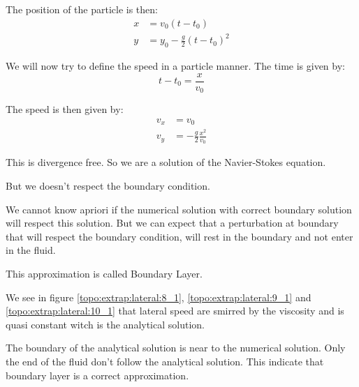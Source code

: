 The position of the particle is then:
\begin{align}
	x&=v_{0}(t-t_0)\\
	y&=y_0-\frac{g}{2}(t-t_0)^2
\end{align}

We will now try to define the speed in a particle manner.
The time is given by:
\begin{equation}
	t-t_{0}=\frac{x}{v_{0}}
\end{equation}

The speed is then given by:
\begin{align}
	v_{x}&=v_{0}\\
	v_{y}&=-\frac{g}{2}\frac{x^2}{v_{0}}
\end{align}

This is divergence free.
So we are a solution of the Navier-Stokes equation.

But we doesn't respect the boundary condition.

We cannot know apriori if the numerical solution with correct boundary solution will respect this solution.
But we can expect that a perturbation at boundary that will respect the boundary condition,
will rest in the boundary and not enter in the fluid.

This approximation is called Boundary Layer.


We see in figure \ref{topo:extrap:lateral:8_1}, \ref{topo:extrap:lateral:9_1} and \ref{topo:extrap:lateral:10_1} that lateral
speed are smirred by the viscosity and is quasi constant witch is the analytical solution.

The boundary of the analytical solution is near to the numerical solution.
Only the end of the fluid don't follow the analytical solution.
This indicate that boundary layer is a correct approximation.

